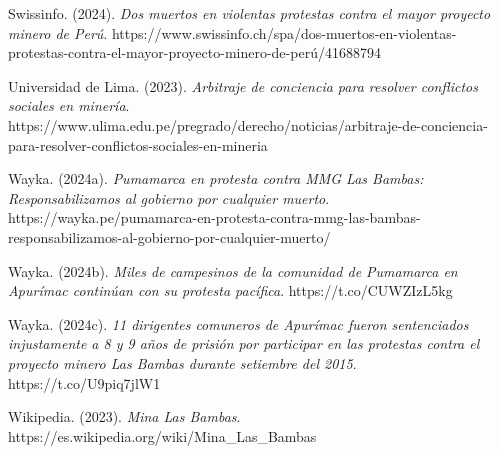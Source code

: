 \documentclass[
  stu,
  floatsintext,
  longtable,
  a4paper,
  nolmodern,
  notxfonts,
  notimes,
  colorlinks=true,linkcolor=blue,citecolor=blue,urlcolor=blue]{apa7}
\begin{document}
Swissinfo. (2024). \emph{Dos muertos en violentas protestas contra el
mayor proyecto minero de Perú}.
https://www.swissinfo.ch/spa/dos-muertos-en-violentas-protestas-contra-el-mayor-proyecto-minero-de-perú/41688794

Universidad de Lima. (2023). \emph{Arbitraje de conciencia para resolver
conflictos sociales en minería}.
https://www.ulima.edu.pe/pregrado/derecho/noticias/arbitraje-de-conciencia-para-resolver-conflictos-sociales-en-mineria

Wayka. (2024a). \emph{Pumamarca en protesta contra MMG Las Bambas:
Responsabilizamos al gobierno por cualquier muerto}.
https://wayka.pe/pumamarca-en-protesta-contra-mmg-las-bambas-responsabilizamos-al-gobierno-por-cualquier-muerto/

Wayka. (2024b). \emph{Miles de campesinos de la comunidad de Pumamarca
en Apurímac continúan con su protesta pacífica}. https://t.co/CUWZIzL5kg

Wayka. (2024c). \emph{11 dirigentes comuneros de Apurímac fueron
sentenciados injustamente a 8 y 9 años de prisión por participar en las
protestas contra el proyecto minero Las Bambas durante setiembre del
2015}. https://t.co/U9piq7jlW1

Wikipedia. (2023). \emph{Mina Las Bambas}.
https://es.wikipedia.org/wiki/Mina\_Las\_Bambas
\end{document}
